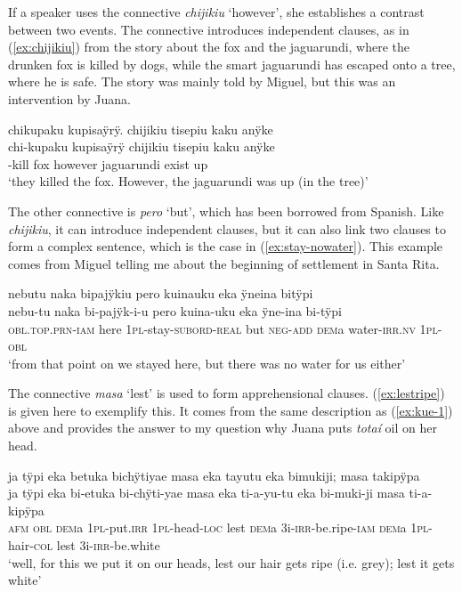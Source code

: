 If a speaker uses the connective \textit{chijikiu} ‘however’, she establishes a contrast between two events. The connective introduces independent clauses, as in (\ref{ex:chijikiu}) from the story about the fox and the jaguarundi, where the drunken fox is killed by dogs, while the smart jaguarundi has escaped onto a tree, where he is safe. The story was mainly told by Miguel, but this was an intervention by Juana.

\newpage

\ea\label{ex:chijikiu}
\begingl
\glpreamble chikupaku kupisaÿrÿ. chijikiu tisepiu kaku anÿke\\
\gla chi-kupaku kupisaÿrÿ chijikiu tisepiu kaku anÿke\\
-kill fox however jaguarundi exist up\\
\glft ‘they killed the fox. However, the jaguarundi was up (in the tree)’
\endgl
\trailingcitation{[jmx-n120429ls-x5.443-445]}
\xe

The other  connective is \textit{pero} ‘but’, which has been borrowed from Spanish. Like \textit{chijikiu}, it can introduce independent clauses, but it can also link two clauses to form a complex sentence, which is the case in (\ref{ex:stay-nowater}). This example comes from Miguel telling me about the beginning of settlement in Santa Rita.

\ea\label{ex:stay-nowater}
\begingl
\glpreamble nebutu naka bipajÿkiu pero kuinauku eka ÿneina bitÿpi\\
\gla nebu-tu naka bi-pajÿk-i-u pero kuina-uku eka ÿne-ina bi-tÿpi\\
\textsc{obl.top.prn}-\textsc{iam} here 1\textsc{pl}-stay-\textsc{subord}-\textsc{real} but \textsc{neg}-\textsc{add} \textsc{dem}a water-\textsc{irr.nv} 1\textsc{pl}-\textsc{obl}\\
\glft ‘from that point on we stayed here, but there was no water for us either’
\endgl
\trailingcitation{[mxx-p110825l.060]}
\xe

The connective \textit{masa} ‘lest’ is used to form apprehensional clauses. (\ref{ex:lestripe}) is given here to exemplify this. It comes from the same description as (\ref{ex:kue-1}) above and provides the answer to my question why Juana puts \textit{totaí} oil on her head.


\ea\label{ex:lestripe}
\begingl
\glpreamble ja tÿpi eka betuka bichÿtiyae masa eka tayutu eka bimukiji; masa takipÿpa\\
\gla ja tÿpi eka bi-etuka bi-chÿti-yae masa eka ti-a-yu-tu eka bi-muki-ji masa ti-a-kipÿpa\\
\glb \textsc{afm} \textsc{obl} \textsc{dem}a 1\textsc{pl}-put.\textsc{irr} 1\textsc{pl}-head-\textsc{loc} lest \textsc{dem}a 3i-\textsc{irr}-be.ripe-\textsc{iam} \textsc{dem}a 1\textsc{pl}-hair-\textsc{col} lest 3i-\textsc{irr}-be.white\\
\glft ‘well, for this we put it on our heads, lest our hair gets ripe (i.e. grey); lest it gets white’
\endgl
\trailingcitation{[jxx-d181102l.05-07]}
\xe
{}

